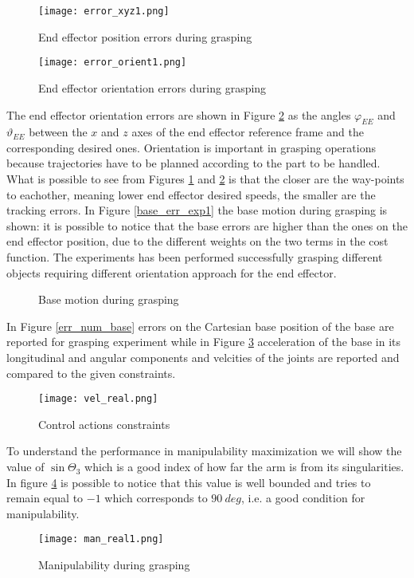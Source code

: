 \begin{figure}[h!]
\centering
\texttt{[image: error\_xyz1.png]}
\caption{End effector position errors during grasping}
\label{error_xyz1}
\end{figure}
\begin{figure}[h!]
\centering
\texttt{[image: error\_orient1.png]}
\caption{End effector orientation errors during grasping}
\label{error_orient1}
\end{figure}
The end effector orientation errors are shown in Figure \ref{error_orient1} as the angles $\varphi_{EE}$ and $\vartheta_{EE}$ between the $x$ and $z$ axes of the end effector reference frame and the corresponding desired ones. Orientation is important in grasping operations because trajectories have to be planned according to the part to be handled. What is possible to see from Figures \ref{error_xyz1} and \ref{error_orient1} is that the closer are the way-points to eachother, meaning lower end effector desired speeds, the smaller are the tracking errors. In Figure \ref{base_err_exp1} the base motion during grasping is shown: it is possible to notice that the base errors are higher than the ones on the end effector position, due to the different weights on the two terms in the cost function.
The experiments has been performed successfully grasping different objects requiring different orientation approach for the end effector.  

\begin{figure}%
\centering
{}%
\qquad
{}%
\caption{Base motion during grasping}
\end{figure}

In Figure \ref{err_num_base} errors on the Cartesian base position of the base are reported for grasping experiment while in Figure \ref{vel_real} acceleration of the base in its longitudinal and angular components and velcities of the joints are reported and compared to the given constraints.

\begin{figure}[h!]
\centering
\texttt{[image: vel\_real.png]}
\caption{Control actions constraints}
\label{vel_real}
\end{figure}
To understand the performance in manipulability maximization we will show the value of $\sin\Theta_3$ which is a good index of how far the arm is from its singularities. In figure \ref{man_real1} is possible to notice that this value is well bounded and tries to remain equal to $-1$ which corresponds to $90\ deg$, i.e. a good condition for manipulability.
\begin{figure}[h!]
\centering
\texttt{[image: man\_real1.png]}
\caption{Manipulability during grasping}
\label{man_real1}
\end{figure}
